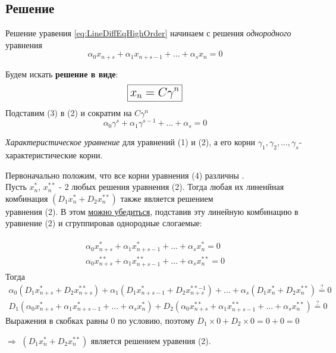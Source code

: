 \documentclass[a4paper,11pt]{article}
\begin{document}
  \subsection{Решение}
    Решение уравения \ref{eq:LineDiffEqHighOrder} начинаем с решения \textit{однородного} уравнения
    \begin{equation}
      \alpha_0 x_{n+s} + \alpha_1 x_{n+s-1} +...+ \alpha_s x_n = 0
    \end{equation}

    Будем искать \textbf{решение в виде}:
    \begin{equation}
    \Large {
      \boxed{x_n = C\gamma^n}
    }
    \end{equation}
    Подставим (3) в (2) и сократим на $C \gamma^n$
    \begin{equation}
      \boxed{\alpha_0 \gamma^s + \alpha_1 \gamma^{s-1} +...+ \alpha_s = 0}
    \end{equation}
    \begin{center}
      \small{\textit{Характеристическое уравнение} для уравнений (1) и (2), а его корни $\gamma_1, \gamma_2,..., \gamma_s$- характеристические корни.}
    \end{center}
    Первоначально положим, что все корни уравнения (4) различны . \\

    Пусть $x^*_n$, $x_n^{**}$ - 2 любых решения уравнения (2). Тогда любая их линенйная комбинация $(D_1x_n^* + D_2x_n^{**})$ также является решением \\ уравнения (2). В этом \underline{можно убедиться}, подставив эту линейную комбинацию в уравнение (2) и сгруппировав однородные слогаемые: \\
    \small
    {
      \begin{gather*}
        \begin{split}
          \alpha_0 x_{n+s}^* + \alpha_1 x_{n+s-1}^* +...+ \alpha_s x_n^* = 0\\
          \alpha_0 x_{n+s}^{**} + \alpha_1 x_{n+s-1}^{**} +...+ \alpha_s x_n^{**} = 0
          \end{split}
      \end{gather*}
      Тогда
      \begin{gather*}
        \alpha_0 (D_1x_{n+s}^*+D_2x_{n+s}^{**}) + \alpha_1 (D_1x_{n+s-1}^*+D_2x_{n+s}^{**-1}) +...+
        \alpha_s (D_1x_{n}^*+D_2x_{n}^{**}) \stackrel{?}{=} 0 \\
        D_1(\alpha_0 x_{n+s}^* + \alpha_1 x_{n+s-1}^* +...+ \alpha_s x_n^*) +
        D_2(\alpha_0 x_{n+s}^{**} + \alpha_1 x_{n+s-1}^{**} +...+ \alpha_s x_n^{**}) \stackrel{?}{=} 0
      \end{gather*}
      Выражения в скобках равны $0$ по условию, поэтому $D_1\times0 + D_2\times0 = 0 + 0 = 0$
      \begin{center}
        $\Rightarrow$ $(D_1x_n^* + D_2x_n^{**})$ является решением уравения (2).
      \end{center}
    }
\end{document}
